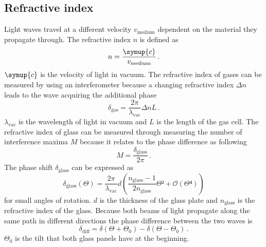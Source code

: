  \subsection{Refractive index}
 Light waves travel at a different velocity $v_{\text{medium}}$ dependent on the material they propagate through. 
 The refractive index $n$ is defined as 
 \begin{equation}
    n = \frac{\symup{c}}{v_{\text{medium}}} \label{n_generell} \, .
 \end{equation}
 $\symup{c}$ is the velocity of light in vacuum. 
 The refractive index of gases can be measured by using an interferometer because a changing refractive 
 index $\Delta n$ leads to the wave acquiring the additional phase 
 \begin{equation}
    \delta_{\text{gas}} = \frac{2 \pi}{\lambda_{\text{vac}}} \Delta n L \, . \label{eqn:delta_gas}
 \end{equation}
 $\lambda_{\text{vac}}$ is the wavelength of light in vacuum and $L$ is the length of the gas cell. 
 The refractive index of glass can be measured through measuring the number of interference maxima $M$
 because it relates to the phase difference as following 
 \begin{equation}
    M = \frac{\delta_{\text{glass}}}{2\pi} \label{eqn:M} \, .
 \end{equation}
 The phase shift $\delta_{\text{glass}}$ can be expressed as 
 \begin{equation}
    \delta_{\text{glass}}(\Theta) = \frac{2 \pi}{\lambda_{\text{vac}}} d \left( \frac{n_{\text{glass}}-1}{2n_{\text{glass}}} \Theta² + \mathcal{O}(\Theta⁴)\right) 
    \label{eqn:delta_glass_vontheta}
 \end{equation}
 for small angles of rotation. 
 $d$ is the thickness of the glass plate and $n_{\text{glass}}$ is the refractive index of the glass. 
 Because both beams of light propagate along the same path in different directions the phase difference between the two waves is 
 \begin{equation}
    \delta_{\text{diff}} = \delta(\Theta + \Theta_0) - \delta(\Theta - \Theta_0) \label{eqn:delta_diff} \, .
 \end{equation}
 $\Theta_0$ is the tilt that both glass panels have at the beginning. 
